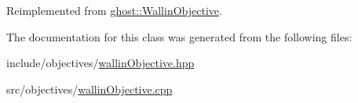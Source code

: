 Reimplemented from \hyperlink{classghost_1_1WallinObjective_abc0f66adeebca9f9787a4ae348219fb8}{ghost\-::\-Wallin\-Objective}.



The documentation for this class was generated from the following files\-:\begin{DoxyCompactItemize}
\item 
include/objectives/\hyperlink{wallinObjective_8hpp}{wallin\-Objective.\-hpp}\item 
src/objectives/\hyperlink{wallinObjective_8cpp}{wallin\-Objective.\-cpp}\end{DoxyCompactItemize}
